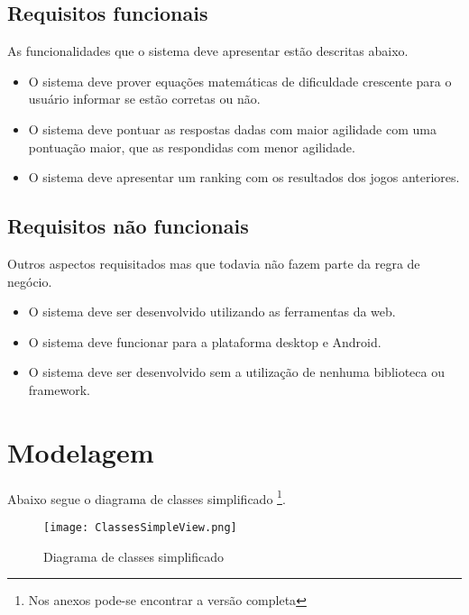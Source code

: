 \subsection{Requisitos funcionais}

As funcionalidades que o sistema deve apresentar estão descritas abaixo.

\begin{itemize}
    \item O sistema deve prover equações matemáticas de dificuldade crescente para o usuário informar se estão corretas ou não.
    \item O sistema deve pontuar as respostas dadas com maior agilidade com uma pontuação maior, que as respondidas com menor agilidade.
    \item O sistema deve apresentar um ranking com os resultados dos  jogos anteriores.
\end{itemize}

\subsection{Requisitos não funcionais}

Outros aspectos requisitados mas que todavia não fazem parte da regra de negócio.

\begin{itemize}
    \item O sistema deve ser desenvolvido utilizando as ferramentas da web.
    \item O sistema deve funcionar para a plataforma desktop e Android.
    \item O sistema deve ser desenvolvido sem a utilização de nenhuma biblioteca ou framework.
\end{itemize}

\section{Modelagem}

Abaixo segue o diagrama de classes simplificado \footnote{Nos anexos pode-se encontrar a versão completa}.

\begin{figure}
    \centering
    \texttt{[image: ClassesSimpleView.png]}
	\caption{Diagrama de classes simplificado}
\end{figure}

